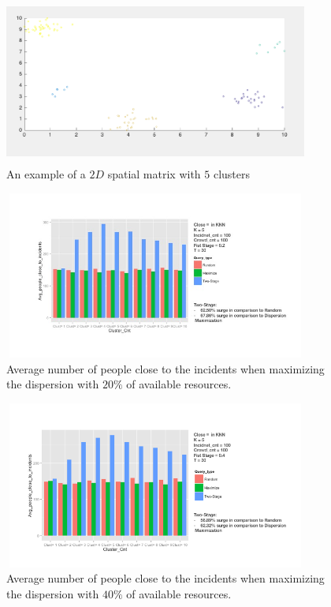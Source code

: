\documentclass{acm_proc_article-sp}
\begin{document}
\begin{figure}[!htb]
\centering
   \includegraphics[width=10cm ,height=5.5cm]{figuresPng/clust.png}
   \caption{An example of a $2D$ spatial matrix with $5$ clusters }\label{fig: clust}
\end{figure}

\begin{figure}[!htb]
\centering
   \includegraphics[width=10cm ,height=5.5cm]{figuresPng/FirstStageTwentyPerc}
   \caption{Average number of people close to the incidents when maximizing the dispersion with $20\%$ of available resources. }\label{fig: heatMap}
\end{figure}

\begin{figure}[!htb]
\centering
   \includegraphics[width=10cm ,height=5.5cm]{figuresPng/FirstStageFortyPerc}
   \caption{Average number of people close to the incidents when maximizing the dispersion with $40\%$ of available resources. }\label{fig: heatMap}
\end{figure}
\end{document}
